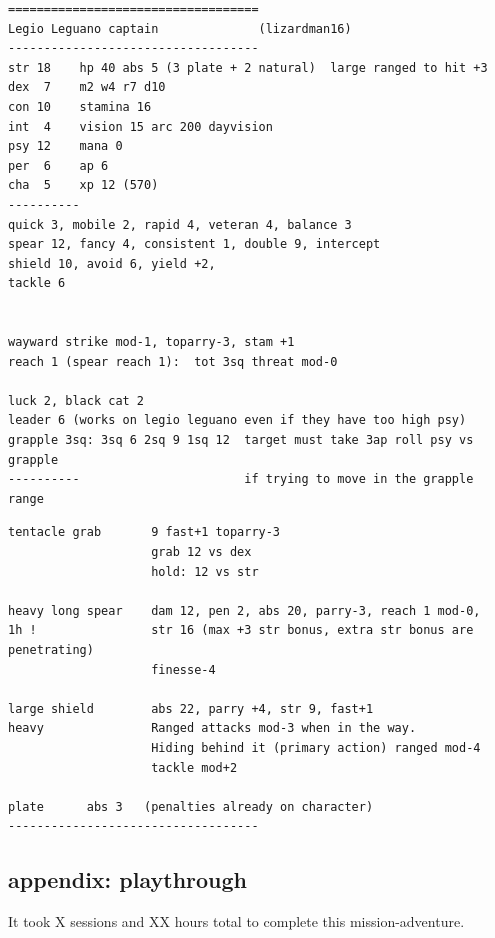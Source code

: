 \goodbreak
\begin{samepage}
\small \begin{verbatim}
===================================
Legio Leguano captain              (lizardman16)
-----------------------------------
str 18    hp 40 abs 5 (3 plate + 2 natural)  large ranged to hit +3
dex  7    m2 w4 r7 d10
con 10    stamina 16
int  4    vision 15 arc 200 dayvision
psy 12    mana 0
per  6    ap 6
cha  5    xp 12 (570)
----------
quick 3, mobile 2, rapid 4, veteran 4, balance 3
spear 12, fancy 4, consistent 1, double 9, intercept
shield 10, avoid 6, yield +2,
tackle 6


wayward strike mod-1, toparry-3, stam +1
reach 1 (spear reach 1):  tot 3sq threat mod-0

luck 2, black cat 2
leader 6 (works on legio leguano even if they have too high psy)
grapple 3sq: 3sq 6 2sq 9 1sq 12  target must take 3ap roll psy vs grapple
----------                       if trying to move in the grapple range
\end{verbatim} \blocklistgap \begin{verbatim}
tentacle grab       9 fast+1 toparry-3
                    grab 12 vs dex
                    hold: 12 vs str

heavy long spear    dam 12, pen 2, abs 20, parry-3, reach 1 mod-0,
1h !                str 16 (max +3 str bonus, extra str bonus are penetrating)
                    finesse-4

large shield        abs 22, parry +4, str 9, fast+1
heavy               Ranged attacks mod-3 when in the way.
                    Hiding behind it (primary action) ranged mod-4
                    tackle mod+2

plate      abs 3   (penalties already on character)
-----------------------------------
\end{verbatim} \normalsize
\end{samepage}







\clearpage
{}
\subsection*{appendix: playthrough}
It took X sessions and XX hours total to complete this mission-adventure.

